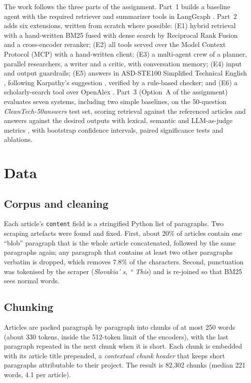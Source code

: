 \documentclass[conference]{IEEEtran}
\begin{document}
The work follows the three parts of the assignment. Part~1 builds a baseline agent with the required
retriever and summarizer tools in LangGraph \cite{langgraph}. Part~2 adds six extensions, written from
scratch where possible: (E1) hybrid retrieval with a hand-written BM25 \cite{robertson2009bm25} fused with
dense search by Reciprocal Rank Fusion \cite{cormack2009rrf} and a cross-encoder reranker; (E2) all tools
served over the Model Context Protocol (MCP) \cite{anthropic2024mcp} with a hand-written client; (E3) a
multi-agent crew of a planner, parallel researchers, a writer and a critic, with conversation memory;
(E4) input and output guardrails; (E5) answers in ASD-STE100 Simplified Technical English
\cite{asdste100}, following Karpathy's suggestion \cite{nikhil2026karpathy}, verified by a rule-based checker;
and (E6) a scholarly-search tool over OpenAlex \cite{priem2022openalex}. Part~3 (Option~A of the assignment) evaluates seven systems, including two simple baselines, on
the 50-question \emph{CleanTech-50answers} test set, scoring retrieval against the referenced articles and
answers against the desired outputs with lexical, semantic and LLM-as-judge metrics
\cite{zheng2023judge}, with bootstrap confidence intervals, paired significance tests and ablations.

\section{Data}
\subsection{Corpus and cleaning}
Each article's \texttt{content} field is a stringified Python list of paragraphs. Two scraping artefacts were
found and fixed. First, about 20\% of articles contain one ``blob'' paragraph that is the whole article
concatenated, followed by the same paragraphs again; any paragraph that contains at least two other
paragraphs verbatim is dropped, which removes 7.8\% of the characters. Second, punctuation was tokenised by
the scraper (\textit{Slovakia' s}, \textit{`` This}) and is re-joined so that BM25 sees normal words.

\subsection{Chunking}
Articles are packed paragraph by paragraph into chunks of at most 250 words (about 330 tokens, inside the
512-token limit of the encoders), with the last paragraph repeated in the next chunk when it is short. Each
chunk is embedded with its article title prepended, a \emph{contextual chunk header} that keeps short
paragraphs attributable to their project. The result is 82{,}302 chunks (median 221 words, 4.1 per article).
\end{document}
